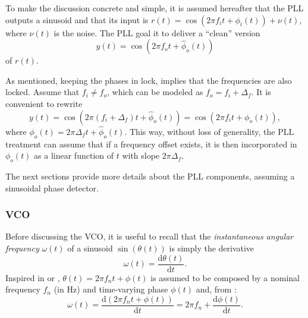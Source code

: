 
To make the discussion concrete and simple, it is assumed hereafter that the PLL outputs a sinusoid and that its
input is $r(t)=\cos(2\pi f_i t+\phi_i(t)) + \nu(t)$, where $\nu(t)$ is the noise.
The PLL goal it to deliver a ``clean'' version 
\begin{equation}
y(t)=\cos(2 \pi f_o t + \hat \phi_o(t))
\label{eq:vcoOutput}
\end{equation}
of $r(t)$.

As mentioned, keeping the phases in lock, implies that the frequencies are also locked. Assume that $f_i \ne f_o$, which can be modeled as $f_o = f_i + \Delta_f$. It is convenient
to rewrite 
\begin{equation}
y(t)=\cos(2 \pi (f_i + \Delta_f) t + \hat \phi_o(t)) = \cos(2 \pi f_i t +  \phi_o(t)), 
\label{eq:vcoTrick}
\end{equation}
where $\phi_o(t) = 2 \pi \Delta_f t + \hat \phi_o(t)$.
This way, without loss of generality, the PLL treatment can assume that if a frequency
offset exists, it is then incorporated in $\phi_o(t)$ as a linear function of $t$ with slope 
$2 \pi \Delta_f$.

The next sections provide more details about the PLL components, assuming 
a sinusoidal phase detector.

\subsubsection{VCO}

Before discussing the VCO, it is useful to recall that the \emph{instantaneous angular frequency} $\omega(t)$ of a sinusoid $\sin(\theta(t))$ is simply the derivative
\begin{equation}
\omega(t) = \frac{\textrm{d} \theta(t)}{\textrm{d} t}.
\label{eq:instantaneousFrequency}
\end{equation}
Inspired in  or , $\theta(t)=2 \pi f_n t + \phi(t)$ is assumed to be composed
by a nominal frequency $f_n$ (in Hz) and time-varying phase $\phi(t)$ and, from :
\begin{equation}
\omega(t) = \frac{\textrm{d} (2 \pi f_n t + \phi(t)) }{\textrm{d} t} = 2 \pi f_n + \frac{\textrm{d} \phi(t) }{\textrm{d} t}.
\label{eq:vcoOmega}
\end{equation}

